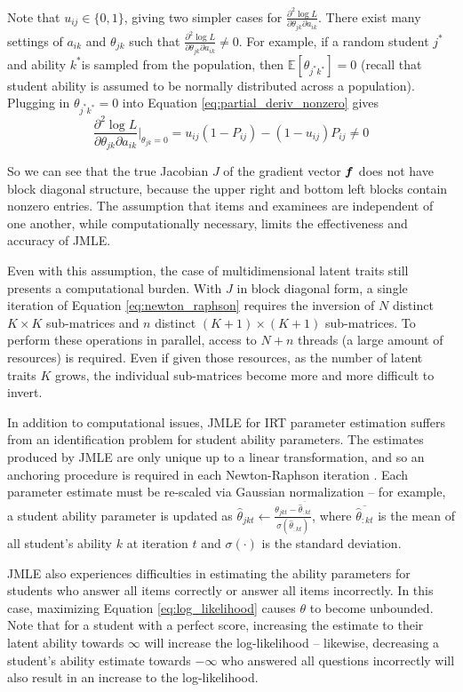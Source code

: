 Note that $u_{ij} \in \{0,1\}$, giving two simpler cases for $\frac{\partial^2 \log L}{\partial \theta_{jk} \partial a_{ik}}$. There exist many settings of $a_{ik}$ and $\theta_{jk}$ such that  $\frac{\partial^2 \log L}{\partial \theta_{jk} \partial a_{ik}} \not = 0$. For example, if a random student $j^*$ and ability $k^*$is sampled from the population, then $\mathbb{E}[\theta_{j^*k^*}] = 0$ (recall that student ability is assumed to be normally distributed across a population). Plugging in $\theta_{j^*k^*} = 0$ into Equation \ref{eq:partial_deriv_nonzero} gives
\[\frac{\partial^2 \log L}{\partial \theta_{jk} \partial a_{ik}}\Big|_{\theta_{jk}=0} = u_{ij}(1-P_{ij}) - (1-u_{ij})P_{ij} \not= 0 \]

So we can see that the true Jacobian $J$ of the gradient vector $\boldsymbol{f}$ does not have block diagonal structure, because the upper right and bottom left blocks contain nonzero entries. The assumption that items and examinees are independent of one another, while computationally necessary, limits the effectiveness and accuracy of JMLE. 

Even with this assumption, the case of multidimensional latent traits still presents a computational burden. With $J$ in block diagonal form, a single iteration of Equation \ref{eq:newton_raphson} requires the inversion of $N$ distinct $K\times K$ sub-matrices and $n$ distinct $(K+1) \times (K+1)$ sub-matrices. To perform these operations in parallel, access to $N + n$ threads (a large amount of resources) is required. Even if given those resources, as the number of latent traits $K$ grows, the individual sub-matrices become more and more difficult to invert.

In addition to computational issues, JMLE for IRT parameter estimation suffers from an identification problem for student ability parameters. The estimates produced by JMLE are only unique up to a linear transformation, and so an anchoring procedure is required in each Newton-Raphson iteration \cite{baker_kim2004}. Each parameter estimate must be re-scaled via Gaussian normalization -- for example, a student ability parameter is updated as $\hat \theta_{jkt} \gets \frac{\theta_{jkt} - \overline{\hat \theta_{:kt}}}{\sigma(\hat \theta_{:kt})}$, where $\overline{\hat \theta_{:kt}}$ is the mean of all student's ability $k$ at iteration $t$ and  $\sigma(\cdot)$ is the standard deviation.

JMLE also experiences difficulties in estimating the ability parameters for students who answer all items correctly or answer all items incorrectly. In this case, maximizing Equation \ref{eq:log_likelihood} causes $\theta$ to become unbounded. Note that for a student with a perfect score, increasing the estimate to their latent ability towards $\infty$ will increase the log-likelihood -- likewise, decreasing a student's ability estimate towards $-\infty$ who answered all questions incorrectly will also result in an increase to the log-likelihood.


